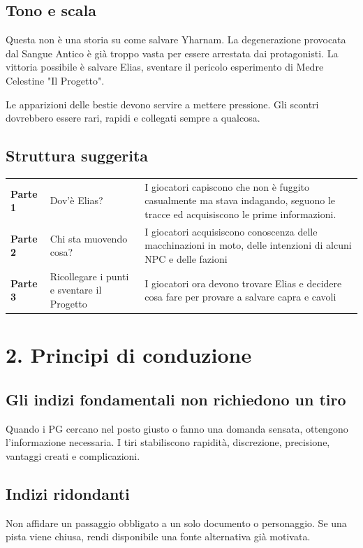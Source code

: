 \documentclass[11pt,a4paper]{article}
\begin{document}
\subsection{Tono e scala}
Questa non è una storia su come salvare Yharnam. La degenerazione provocata dal Sangue Antico è già troppo vasta per essere arrestata dai protagonisti. La vittoria possibile è salvare Elias, sventare il pericolo esperimento di Medre Celestine "Il Progetto".

Le apparizioni delle bestie devono servire a mettere pressione. Gli scontri dovrebbero essere rari, rapidi e collegati sempre a qualcosa.

\subsection{Struttura suggerita}
\begin{tabularx}{\linewidth}{>{\bfseries}p{25mm} X X}
Parte 1 & Dov'è Elias? & I giocatori capiscono che non è fuggito casualmente ma stava indagando, seguono le tracce ed acquisiscono le prime informazioni.\\
Parte 2 & Chi sta muovendo cosa? & I giocatori acquisiscono conoscenza delle macchinazioni in moto, delle intenzioni di alcuni NPC e delle fazioni\\
Parte 3 & Ricollegare i punti e sventare il Progetto & I giocatori ora devono trovare Elias e decidere cosa fare per provare a salvare capra e cavoli\\
\end{tabularx}

\section{2. Principi di conduzione}


\subsection{Gli indizi fondamentali non richiedono un tiro}
Quando i PG cercano nel posto giusto o fanno una domanda sensata, ottengono l'informazione necessaria. I tiri stabiliscono rapidità, discrezione, precisione, vantaggi creati e complicazioni.

\subsection{Indizi ridondanti}
Non affidare un passaggio obbligato a un solo documento o personaggio. Se una pista viene chiusa, rendi disponibile una fonte alternativa già motivata.
\end{document}
